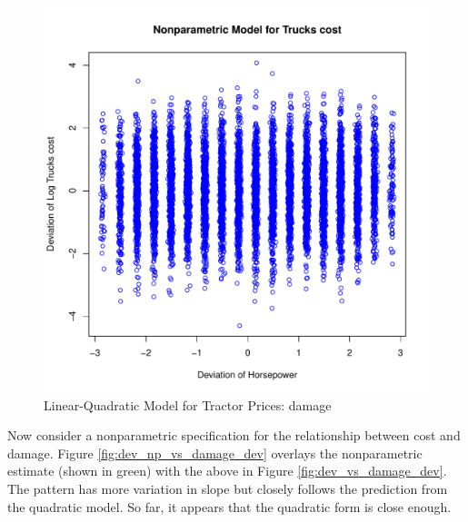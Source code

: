 \documentclass[11pt]{paper}
\begin{document}
\begin{figure}[h!]
  \centering
  \includegraphics[scale = 0.5, keepaspectratio=true]{../Figures/dev_vs_cost_dev}
  \caption{Linear-Quadratic Model for Tractor Prices: damage} \label{fig:dev_vs_cost_dev}
\end{figure}

\clearpage
Now consider a nonparametric specification for 
the relationship between cost and damage.
Figure \ref{fig:dev_np_vs_damage_dev} 
overlays the nonparametric estimate (shown in green) with the above in 
Figure \ref{fig:dev_vs_damage_dev}.
The pattern has more variation in slope but 
closely follows the prediction from the quadratic model. 
So far, it appears that the quadratic form
is close enough.
\end{document}
